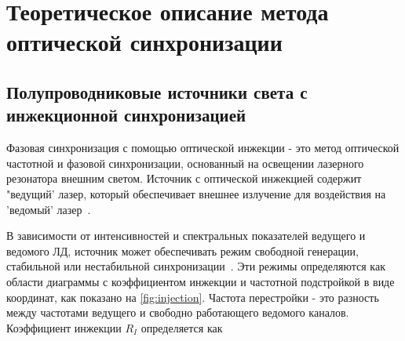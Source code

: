 \section{Теоретическое описание метода оптической синхронизации}
\label{sec:theory}

\subsection{Полупроводниковые источники света с инжекционной синхронизацией}

Фазовая синхронизация с помощью оптической инжекции - это метод оптической частотной и фазовой синхронизации, основанный на освещении лазерного резонатора внешним светом. Источник с оптической инжекцией содержит "ведущий' лазер, который обеспечивает внешнее излучение для воздействия на 'ведомый' лазер~\cite{liu2020}. 

В зависимости от интенсивностей и спектральных показателей ведущего и ведомого ЛД, источник может обеспечивать режим свободной генерации, стабильной или нестабильной синхронизации~\cite{lau2008}. Эти режимы определяются как области диаграммы с коэффициентом инжекции и частотной подстройкой в виде координат, как показано на \cref{fig:injection}. Частота перестройки - это разность между частотами ведущего и свободно работающего ведомого каналов. Коэффициент инжекции $R_I$ определяется как 

